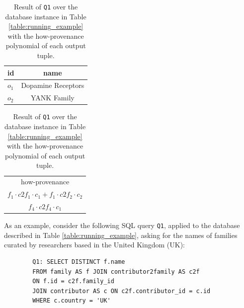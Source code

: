 \documentclass[preprint,12pt,sort&compress]{elsarticle}
\begin{document}
\begin{table}[]
\centering
  \begin{tabular}{|l||c|}
  \hline
    id & name\\
    \hline
    $o_1$ &  Dopamine Receptors\\
    $o_2$ & YANK Family\\
    \hline
  \end{tabular}
  \begin{tabular}{c}
  	how-provenance   \\
  	$f_1 \cdot c2f_1 \cdot c_1 + f_1 \cdot c2f_2 \cdot c_2$ \\
  	$f_4 \cdot c2f_4 \cdot c_1$ \\
  \end{tabular}
    \caption{Result of \texttt{Q1} over the database instance in Table \ref{table:running_example} with the  how-provenance polynomial of each output tuple.}
  \label{table:result_how_prov}
\end{table} 

As an example, consider the following SQL query \texttt{Q1}, applied to the database described in Table \ref{table:running_example}, asking for the names of families curated by researchers based in the United Kingdom (UK):

\vspace{2mm}
{\footnotesize
\begin{adjustwidth}{25pt}{0pt}
\begin{verbatim}
		Q1: SELECT DISTINCT f.name
		FROM family AS f JOIN contributor2family AS c2f 
		ON f.id = c2f.family_id
		JOIN contributor AS c ON c2f.contributor_id = c.id
		WHERE c.country = 'UK'
\end{verbatim}	
\end{adjustwidth}
}
\vspace{2mm}
\end{document}
